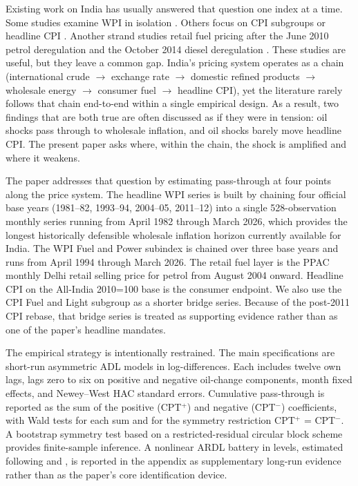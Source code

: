 \documentclass[11pt,a4paper]{article}
\begin{document}
Existing work on India has usually answered that question one index at a time. Some studies examine WPI in isolation \citep{bhoi2012,suresh2026}. Others focus on CPI subgroups or headline CPI \citep{abubakar2018,sek2019}. Another strand studies retail fuel pricing after the June 2010 petrol deregulation and the October 2014 diesel deregulation \citep{pradeep2022,deheri2024}. These studies are useful, but they leave a common gap. India's pricing system operates as a chain (international crude $\to$ exchange rate $\to$ domestic refined products $\to$ wholesale energy $\to$ consumer fuel $\to$ headline CPI), yet the literature rarely follows that chain end-to-end within a single empirical design. As a result, two findings that are both true are often discussed as if they were in tension: oil shocks pass through to wholesale inflation, and oil shocks barely move headline CPI. The present paper asks where, within the chain, the shock is amplified and where it weakens.

The paper addresses that question by estimating pass-through at four points along the price system. The headline WPI series is built by chaining four official base years (1981--82, 1993--94, 2004--05, 2011--12) into a single 528-observation monthly series running from April 1982 through March 2026, which provides the longest historically defensible wholesale inflation horizon currently available for India. The WPI Fuel and Power subindex is chained over three base years and runs from April 1994 through March 2026. The retail fuel layer is the PPAC monthly Delhi retail selling price for petrol from August 2004 onward. Headline CPI on the All-India 2010=100 base is the consumer endpoint. We also use the CPI Fuel and Light subgroup as a shorter bridge series. Because of the post-2011 CPI rebase, that bridge series is treated as supporting evidence rather than as one of the paper's headline mandates.

The empirical strategy is intentionally restrained. The main specifications are short-run asymmetric ADL models in log-differences. Each includes twelve own lags, lags zero to six on positive and negative oil-change components, month fixed effects, and Newey--West HAC standard errors. Cumulative pass-through is reported as the sum of the positive (CPT$^+$) and negative (CPT$^-$) coefficients, with Wald tests for each sum and for the symmetry restriction CPT$^+$ = CPT$^-$. A bootstrap symmetry test based on a restricted-residual circular block scheme provides finite-sample inference. A nonlinear ARDL battery in levels, estimated following \citet{pesaran2001} and \citet{shin2014}, is reported in the appendix as supplementary long-run evidence rather than as the paper's core identification device.
\end{document}
